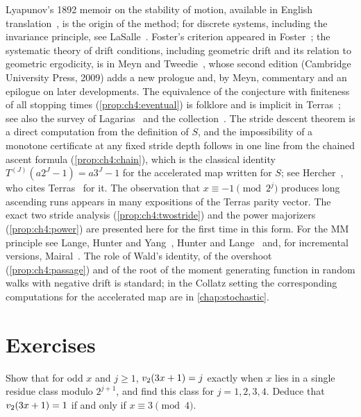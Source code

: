 Lyapunov's 1892 memoir on the stability of motion, available in English translation~\cite{lyapunov1992}, is the origin of the method;
for discrete systems, including the invariance principle, see
LaSalle~\cite{lasalle1986}.  Foster's criterion appeared in
Foster~\cite{foster1953}; the systematic theory of drift conditions, including
geometric drift and its relation to geometric ergodicity, is in Meyn and
Tweedie~\cite{meyn1993}, whose second edition (Cambridge University Press,
2009) adds a new prologue and, by Meyn, commentary and an epilogue on later developments.  The equivalence of
the conjecture with finiteness of all stopping times
(\cref{prop:ch4:eventual}) is folklore and is implicit in
Terras~\cite{terras1976}; see also the survey of Lagarias~\cite{lagarias1985}
and the collection~\cite{lagarias2010}.  The stride descent theorem is a direct
computation from the definition of $S$, and the impossibility of a monotone
certificate at any fixed stride depth follows in one line from the chained
ascent formula (\cref{prop:ch4:chain}), which is the classical identity
$T^{(J)}(a2^{J}-1)=a3^{J}-1$ for the accelerated map written for $S$; see
Hercher~\cite[Lemma~8]{hercher2023}, who cites Terras~\cite{terras1976} for it.
The observation that $x\equiv-1\pmod{2^{j}}$ produces long ascending runs
appears in many expositions of the Terras parity vector.  The exact two
stride analysis (\cref{prop:ch4:twostride}) and the power majorizers
(\cref{prop:ch4:power}) are presented here for the first time in this form.
For the MM principle see Lange, Hunter and Yang~\cite{lange2000}, Hunter and
Lange~\cite{hunter2004} and, for incremental versions,
Mairal~\cite{mairal2015}.  The role of Wald's identity, of the overshoot (\cref{prop:ch4:passage}) and of the root of the
moment generating function in random walks with negative drift is standard;
in the Collatz setting the corresponding computations for the accelerated map
are in \cref{chap:stochastic}.

\section*{Exercises}

\begin{exercise}
Show that for odd $x$ and $j\ge1$, $v_2(3x+1)=j$ exactly when $x$ lies in a
single residue class modulo $2^{j+1}$, and find this class for $j=1,2,3,4$.
Deduce that $v_2(3x+1)=1$ if and only if $x\equiv3\pmod4$.
\end{exercise}

